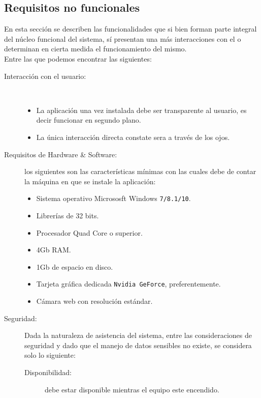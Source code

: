 \documentclass[12pt]{book} %
\begin{document}
	\subsection{Requisitos no funcionales \label{nofuncionales}}
		En esta sección se describen las funcionalidades que si bien forman parte integral del núcleo funcional del sistema, sí presentan una más
		interacciones con el o determinan en cierta medida el funcionamiento del mismo.\\
		Entre las que podemos encontrar las siguientes:
		\begin{description}
			\item[Interacción con el usuario:]\
				\begin{itemize}
					\item La aplicación una vez instalada debe ser transparente al usuario, es decir funcionar en segundo plano.
					\item La única interacción directa constate sera a través de los ojos.
				\end{itemize}
			\item[Requisitos de Hardware \& Software:] los siguientes son las características mínimas con las cuales debe de contar la máquina 
				en que se instale la aplicación: \
				\begin{multicols}{2}
					\begin{itemize}
						\item Sistema operativo Micrososft Windows \texttt{7/8.1/10}.
						\item Librerías de 32 bits.
						\item Procesador Quad Core o superior.
						\item 4Gb RAM.
						\item 1Gb de espacio en disco.
						\item Tarjeta gráfica dedicada \texttt{Nvidia GeForce}, preferentemente.
						\item Cámara web con resolución estándar.
					\end{itemize}
				\end{multicols}
			\item[Seguridad:]
				Dada la naturaleza de asistencia del sistema, entre las consideraciones de seguridad y dado que el manejo de datos sensibles 
				no existe, se considera solo lo siguiente:
				\begin{description}
					\item[Disponibilidad:] debe estar disponible mientras el equipo este encendido.
				\end{description}

\end{description}
\end{document}
